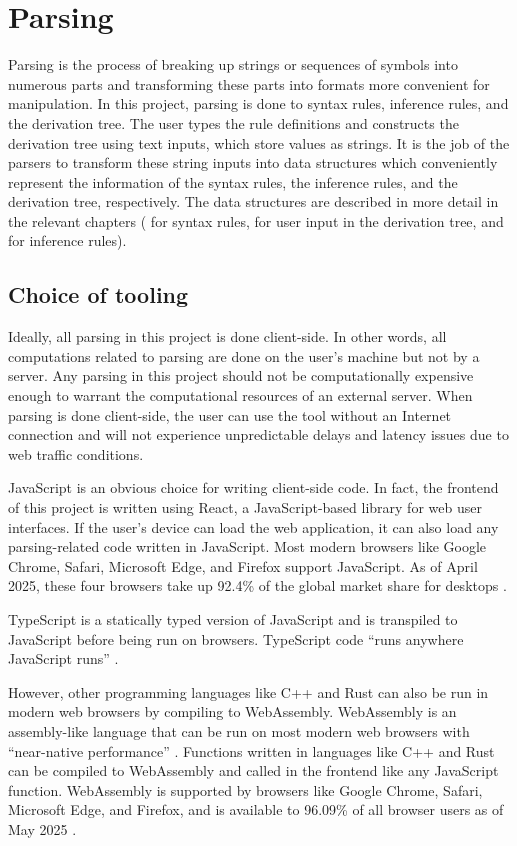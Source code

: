 \section{Parsing}
\label{background:parsing}
Parsing is the process of breaking up strings or sequences of symbols into numerous parts and transforming these parts into formats more convenient for manipulation. In this project, parsing is done to syntax rules, inference rules, and the derivation tree. The user types the rule definitions and constructs the derivation tree using text inputs, which store values as strings. It is the job of the parsers to transform these string inputs into data structures which conveniently represent the information of the syntax rules, the inference rules, and the derivation tree, respectively. The data structures are described in more detail in the relevant chapters ( for syntax rules,  for user input in the derivation tree, and  for inference rules).

\subsection{Choice of tooling}
Ideally, all parsing in this project is done client-side. In other words, all computations related to parsing are done on the user's machine but not by a server. Any parsing in this project should not be computationally expensive enough to warrant the computational resources of an external server. When parsing is done client-side, the user can use the tool without an Internet connection and will not experience unpredictable delays and latency issues due to web traffic conditions.

JavaScript is an obvious choice for writing client-side code. In fact, the frontend of this project is written using React, a JavaScript-based library for web user interfaces. If the user's device can load the web application, it can also load any parsing-related code written in JavaScript. Most modern browsers like Google Chrome, Safari, Microsoft Edge, and Firefox support JavaScript. As of April 2025, these four browsers take up 92.4\% of the global market share for desktops \cite{statcounter}.

TypeScript is a statically typed version of JavaScript and is transpiled to JavaScript before being run on browsers. TypeScript code ``runs anywhere JavaScript runs'' \cite{typescript}.

However, other programming languages like C++ and Rust can also be run in modern web browsers by compiling to WebAssembly. WebAssembly is an assembly-like language that can be run on most modern web browsers with ``near-native performance'' \cite{webassembly}. Functions written in languages like C++ and Rust can be compiled to WebAssembly and called in the frontend like any JavaScript function. WebAssembly is supported by browsers like Google Chrome, Safari, Microsoft Edge, and Firefox, and is available to 96.09\% of all browser users as of May 2025 \cite{webassembly:caniuse}.

